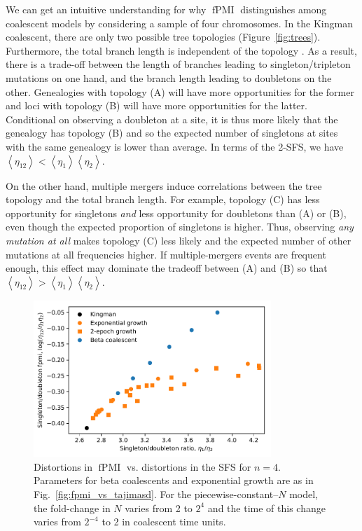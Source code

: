 \documentclass[11pt, letterpaper]{article}   	%
\newcommand{\fig}[1]{Fig.~\ref{#1}}
\newcommand{\Fig}[1]{Figure~\ref{#1}}
\newcommand{\E}[1]{\left< #1 \right>}
\DeclareMathOperator{\fpmi}{fPMI}
\begin{document}
We can get an intuitive understanding for why $\fpmi$ distinguishes among coalescent models by considering a sample of four chromosomes.
In the Kingman coalescent, there are only two possible tree topologies (\Fig{fig:trees}).
Furthermore, the total branch length is independent of the topology \cite{Wakeley2009}.
As a result, there is a trade-off between the length of branches leading to singleton/tripleton mutations on one hand, and the branch length leading to doubletons on the other.
Genealogies with topology (A) will have more opportunities for the former and loci with topology (B) will have more opportunities for the latter.
Conditional on observing a doubleton at a site, it is thus more likely that the genealogy has topology (B) and so the expected number of singletons at sites with the same genealogy is lower than average.
In terms of the 2-SFS, we have $\E{\eta_{12}} < \E{\eta_{1}} \E{\eta_{2}}$.

On the other hand, multiple mergers induce correlations between the tree topology and the total branch length.
For example, topology (C) has less opportunity for singletons \emph{and} less opportunity for doubletons than (A) or (B), even though the expected proportion of singletons is higher.
Thus, observing \emph{any mutation at all} makes topology (C) less likely and the expected number of other mutations at all frequencies higher.
If multiple-mergers events are frequent enough, this effect may dominate the tradeoff between (A) and (B) so that $\E{\eta_{12}} > \E{\eta_{1}} \E{\eta_{2}}$.

\begin{figure}
\centering
\includegraphics[width=0.8\textwidth]{figures/singleton-doubleton.pdf}
\caption{Distortions in $\fpmi$ vs. distortions in the SFS for $n=4$. Parameters for beta coalescents and exponential growth are as in \fig{fig:fpmi_vs_tajimasd}. For the piecewise-constant--$N$ model, the fold-change in $N$ varies from 2 to $2^4$ and the time of this change varies from $2^{-4}$ to 2 in coalescent time units. \label{fig:sdpmi_vs_sdratio}}
\end{figure}
\end{document}
